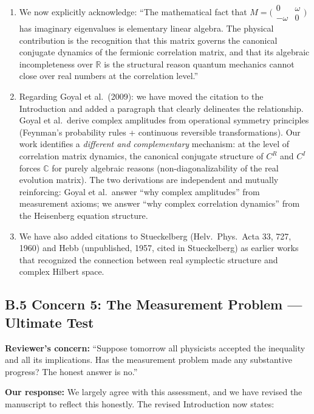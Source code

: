 \documentclass[11pt,a4paper]{article}
\begin{document}
\begin{enumerate}[leftmargin=*]
\item We now explicitly acknowledge: ``The mathematical fact that $M = \bigl(\begin{smallmatrix}0 & \omega \\ -\omega & 0\end{smallmatrix}\bigr)$ has imaginary eigenvalues is elementary linear algebra. The physical contribution is the recognition that this matrix governs the canonical conjugate dynamics of the fermionic correlation matrix, and that its algebraic incompleteness over $\mathbb{R}$ is the structural reason quantum mechanics cannot close over real numbers at the correlation level.''
\item Regarding Goyal et al.\ (2009): we have moved the citation to the Introduction and added a paragraph that clearly delineates the relationship. Goyal et al.\ derive complex amplitudes from operational symmetry principles (Feynman's probability rules + continuous reversible transformations). Our work identifies a \emph{different and complementary} mechanism: at the level of correlation matrix dynamics, the canonical conjugate structure of $C^R$ and $C^I$ forces $\mathbb{C}$ for purely algebraic reasons (non-diagonalizability of the real evolution matrix). The two derivations are independent and mutually reinforcing: Goyal et al.\ answer ``why complex amplitudes'' from measurement axioms; we answer ``why complex correlation dynamics'' from the Heisenberg equation structure.
\item We have also added citations to Stueckelberg (Helv.\ Phys.\ Acta 33, 727, 1960) and Hebb (unpublished, 1957, cited in Stueckelberg) as earlier works that recognized the connection between real symplectic structure and complex Hilbert space.
\end{enumerate}

\subsection*{B.5 Concern 5: The Measurement Problem --- Ultimate Test}

\textbf{Reviewer's concern:} ``Suppose tomorrow all physicists accepted the inequality and all its implications. Has the measurement problem made any substantive progress? The honest answer is no.''

\textbf{Our response:} We largely agree with this assessment, and we have revised the manuscript to reflect this honestly. The revised Introduction now states:
\end{document}

